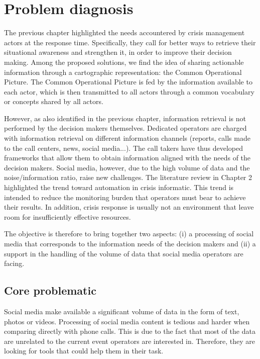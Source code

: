 \section{Problem diagnosis}
The previous chapter highlighted the needs accountered by crisis management actors at the
response time.
Specifically, they call for better ways to retrieve their situational awareness and strengthen it,
in order to improve their decision making.
Among the proposed solutions, we find the idea of sharing actionable information through
a cartographic representation: the Common Operational Picture.
The Common Operational Picture is fed by the information available to each actor, which is then transmitted to
all actors through a common vocabulary or concepts shared by all actors.

However, as also identified in the previous chapter, information retrieval is not performed
by the decision makers themselves.
Dedicated operators are charged with information retrieval on different information channels
(reports, calls made to the call centers, news, social media...).
The call takers have thus developed frameworks that allow them to obtain information
aligned with the needs of the decision makers.
Social media, however, due to the high volume of data and the noise/information ratio,
raise new challenges.
The literature review in Chapter 2 highlighted the trend toward automation in crisis informatic.
This trend is intended to reduce the monitoring burden that operators must bear to achieve their results.
In addition, crisis response is usually not an environment that leave room for insufficiently
effective resources.

The objective is therefore to bring together two aspects: (i) a processing of social media
that corresponds to the information needs of the decision makers and
(ii) a support in the handling of the volume of data that social media operators are facing.

\subsection{Core problematic}
Social media make available a significant volume of data in the form of text, photos or videos.
Processing of social media content is tedious and harder when comparing directly with phone
calls.
This is due to the fact that most of the data are unrelated to the current event operators
are interested in.
Therefore, they are looking for tools that could help them in their task.

